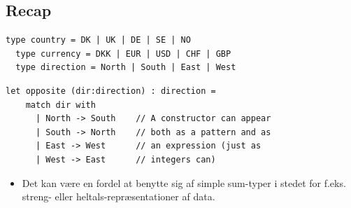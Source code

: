 \documentclass[rgb]{beamer}
\begin{document}
\newcommand{\fboxred}[1]{\color{darkred}\fbox{#1}}
\popmaketitleframe



\subsection{Recap}

\begin{frame}[fragile]
\begin{footnotesize}

  \vspace{1ex}

\begin{lstlisting}[numbers=none,frame=none,mathescape]
  type country = DK | UK | DE | SE | NO
  type currency = DKK | EUR | USD | CHF | GBP
  type direction = North | South | East | West
\end{lstlisting}

  \vspace{1ex}

\begin{lstlisting}[numbers=none,frame=none,mathescape]
  let opposite (dir:direction) : direction =
    match dir with
      | North -> South    // A constructor can appear
      | South -> North    // both as a pattern and as
      | East -> West      // an expression (just as
      | West -> East      // integers can)
\end{lstlisting}

\begin{itemize}
\item Det kan være en fordel at benytte sig af simple sum-typer i
  stedet for f.eks. streng- eller heltals-repræsentationer af data.
\end{itemize}

\end{footnotesize}
\end{frame}
\end{document}
